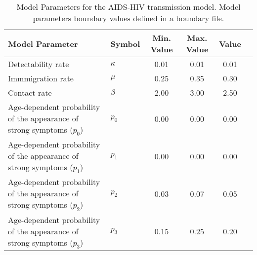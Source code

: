 \begin{table}
\centering
\begin{tabular}{p{5cm}lcccc}
{\bf Model Parameter} & {\bf Symbol} & {\bf Min. Value} & {\bf Max. Value} & {\bf Value}\\
\hline\hline
Detectability rate & $\kappa$ & 0.01 & 0.01 & 0.01\\
Immmigration rate & $\mu$ & 0.25 & 0.35 & 0.30\\
Contact rate & $\beta$ & 2.00 & 3.00 & 2.50\\
Age-dependent probability of the appearance of strong symptoms ($p_0$) & $p_0$ & 0.00 & 0.00 & 0.00\\
Age-dependent probability of the appearance of strong symptoms ($p_1$) & $p_1$ & 0.00 & 0.00 & 0.00\\
Age-dependent probability of the appearance of strong symptoms ($p_2$) & $p_2$ & 0.03 & 0.07 & 0.05\\
Age-dependent probability of the appearance of strong symptoms ($p_3$) & $p_3$ & 0.15 & 0.25 & 0.20\\
\hline\hline
\end{tabular}
\caption{Model Parameters for the AIDS-HIV transmission model. Model parameters boundary values defined in a boundary file.}
\end{table}
